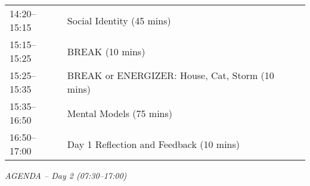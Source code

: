 \documentclass[11pt,a4paper]{article}
\begin{document}
\begin{longtable}[l]{ll}
	14:20--15:15                                                                     & Social Identity                                                            (45 mins)       \\
	15:15--15:25                                                                     & BREAK                                                                      (10 mins)       \\
	15:25--15:35                                                                     & BREAK or ENERGIZER: House, Cat, Storm                                  (10 mins)       \\
	15:35--16:50                                                                     & Mental Models                                                              (75 mins)       \\
	16:50--17:00                                                                     & Day 1 Reflection and Feedback                                              (10 mins)       \\
\end{longtable}
\vspace{-1em}
	\textit{AGENDA -- Day 2 (07:30--17:00)}                  
\end{document}
